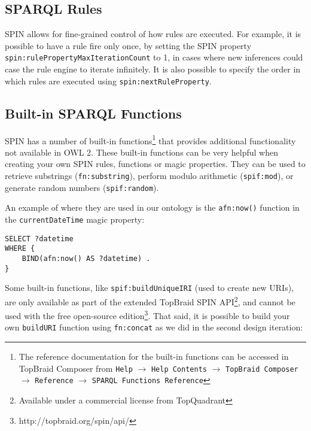 


\subsection{SPARQL Rules}


\ac{SPIN} allows for fine-grained control of how rules are executed. For example, it is possible to have a rule fire only once, by setting the SPIN property \texttt{spin:rulePropertyMaxIterationCount} to 1, in cases where new inferences could case the rule engine to iterate infinitely. It is also possible to specify the order in which rules are executed using \texttt{spin:nextRuleProperty}.


\subsection{Built-in SPARQL Functions}

\ac{SPIN} has a number of built-in functions\footnote{The reference documentation for the built-in functions can be accessed in TopBraid Composer from \texttt{Help} $\rightarrow$ \texttt{Help Contents} $\rightarrow$ \texttt{TopBraid Composer} $\rightarrow$ \texttt{Reference} $\rightarrow$ \texttt{SPARQL Functions Reference}} that provides additional functionality not available in OWL 2. These built-in functions can be very helpful when creating your own SPIN rules, functions or magic properties. They can be used to retrieve substrings (\texttt{fn:substring}), perform modulo arithmetic (\texttt{spif:mod}), or generate random numbers (\texttt{spif:random}).
	
An example of where they are used in our ontology is the \texttt{afn:now()} function in the \texttt{currentDateTime} magic property:

\begin{verbatim}
SELECT ?datetime
WHERE {
	BIND(afn:now() AS ?datetime) .
}
\end{verbatim}

Some built-in functions, like \texttt{spif:buildUniqueIRI} (used to create new URIs), are only available as part of the extended TopBraid SPIN API\footnote{Available under a commercial license from TopQuadrant}, and cannot be used with the free open-source edition\footnote{http://topbraid.org/spin/api/}. That said, it is possible to build your own \texttt{buildURI} function using \texttt{fn:concat} as we did in the second design iteration:

